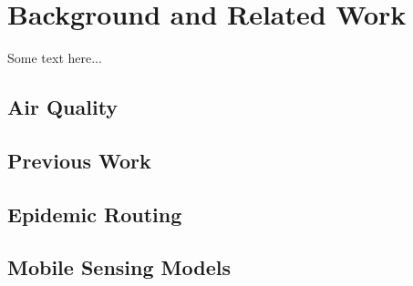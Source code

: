 \chapter{Background and Related Work}\label{background}

Some text here...

\section{Air Quality}\label{background_airquality}
\section{Previous Work}\label{background_previous_work}
\section{Epidemic Routing}\label{background_epidemic_routing}

\section{Mobile Sensing Models}\label{background_mobile_sensing_models}

